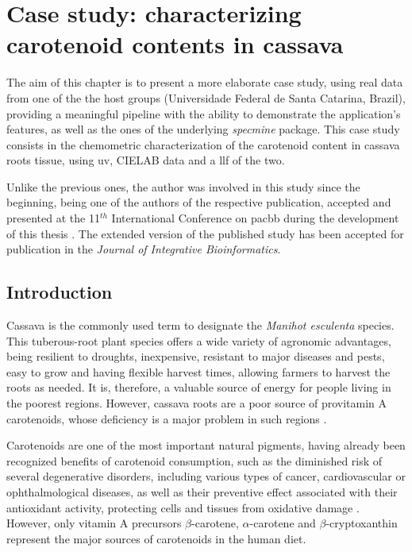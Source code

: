 
\chapter{Case study: characterizing carotenoid contents in cassava} \label{case_study}

The aim of this chapter is to present a more elaborate case study, using real data from one of the the host groups (Universidade Federal de Santa Catarina, Brazil), providing a meaningful pipeline with the ability to demonstrate the application's features, as well as the ones of the underlying \textit{specmine} package. This case study consists in the chemometric characterization of the carotenoid content in cassava roots tissue, using \gls{uv}, CIELAB data and a \acrfull{llf} of the two.

Unlike the previous ones, the author was involved in this study since the beginning, being one of the authors of the respective publication, accepted and presented at the 11$^{th}$ International Conference on \acrfull{pacbb} during the development of this thesis \citep{moresco2017classification}. The extended version of the published study has been accepted for publication in the \textit{Journal of Integrative Bioinformatics}.


\section{Introduction}

Cassava is the commonly used term to designate the \textit{Manihot esculenta} species. This tuberous-root plant species offers a wide variety of agronomic advantages, being resilient to droughts, inexpensive, resistant to major diseases and pests, easy to grow and having flexible harvest times, allowing farmers to harvest the roots as needed. It is, therefore, a valuable source of energy for people living in the poorest regions. However, cassava roots are a poor source of provitamin A carotenoids, whose deficiency is a major problem in such regions \citep{la2013biofortified, sanchez2014prediction}. 

Carotenoids are one of the most important natural pigments, having already been recognized benefits of carotenoid consumption, such as the diminished risk of several degenerative disorders, including various types of cancer, cardiovascular or ophthalmological diseases, as well as their preventive effect associated with their antioxidant activity, protecting cells and tissues from oxidative damage \citep{stahl2003antioxidant}. However, only vitamin A precursors $\beta$-carotene, $\alpha$-carotene and $\beta$-cryptoxanthin represent the major sources of carotenoids in the human diet.

